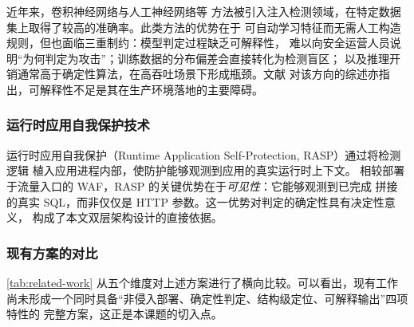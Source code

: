 近年来，卷积神经网络\cite{luo2019deep}与人工神经网络\cite{tang2020detection}等
方法被引入注入检测领域，在特定数据集上取得了较高的准确率。此类方法的优势在于
可自动学习特征而无需人工构造规则，但也面临三重制约：模型判定过程缺乏可解释性，
难以向安全运营人员说明“为何判定为攻击”；训练数据的分布偏差会直接转化为检测盲区；
以及推理开销通常高于确定性算法，在高吞吐场景下形成瓶颈。文献\cite{li2020injection}
对该方向的综述亦指出，可解释性不足是其在生产环境落地的主要障碍。

\subsubsection{运行时应用自我保护技术}

运行时应用自我保护（Runtime Application Self-Protection, RASP）通过将检测逻辑
植入应用进程内部，使防护能够观测到应用的真实运行时上下文\cite{wang2022rasp}。
相较部署于流量入口的 WAF，RASP 的关键优势在于\emph{可见性}：它能够观测到已完成
拼接的真实 SQL，而非仅仅是 HTTP 参数。这一优势对判定的确定性具有决定性意义，
构成了本文双层架构设计的直接依据。

\subsubsection{现有方案的对比}

\cref{tab:related-work} 从五个维度对上述方案进行了横向比较。可以看出，现有工作
尚未形成一个同时具备“非侵入部署、确定性判定、结构级定位、可解释输出”四项特性的
完整方案，这正是本课题的切入点。

